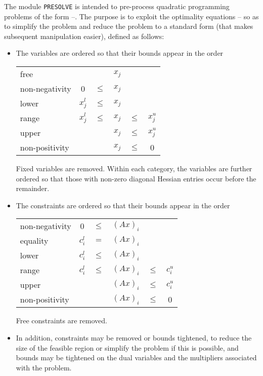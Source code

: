 \documentclass[twoside]{article}
\begin{document}
The module {\tt PRESOLVE} is intended to pre-process
quadratic programming problems of the form --.
The purpose is to exploit the
optimality equations -- so as to simplify the problem
and reduce the problem to a standard form (that makes subsequent
manipulation easier), defined as follows:
\begin{itemize}
\item The variables are ordered so that their bounds appear in the order
\begin{center}
\begin{tabular}{lccccc}
free                &          &        & $x_j$ &        &          \\
non-negativity      &   0      & $\leq$ & $x_j$ &        &          \\
lower               & $x^l_j$ & $\leq$ & $x_j$ &        &          \\
range               & $x^l_j$ & $\leq$ & $x_j$ & $\leq$ & $x^u_j$ \\
upper               &          &        & $x_j$ & $\leq$ & $x^u_j$ \\
non-positivity      &          &        & $x_j$ & $\leq$ &      0   \\
\end{tabular}
\end{center}

Fixed variables are removed. Within each category, the variables
are further ordered so that those with non-zero diagonal Hessian
entries occur before the remainder.

\item
The constraints are ordered so that their bounds appear in the order
\begin{center}
\begin{tabular}{lccccc}
non-negativity      &     0    & $\leq$ & $( A x)_i$ &        &          \\
equality            & $c^l_i$ &   $=$  & $(A x)_i$ &        &          \\
lower               & $c^l_i$ & $\leq$ & $(A x)_i$ &        &          \\
range               & $c^l_i$ & $\leq$ & $(A x)_i$ & $\leq$ & $c^u_i$ \\
upper               &          &        & $(A x)_i$ & $\leq$ & $c^u_i$ \\
non-positivity      &          &        & $(A x)_i$ & $\leq$ &     0    \\
\end{tabular}
\end{center}
Free constraints are removed.

\item
In addition, constraints may be removed or bounds tightened, to reduce the
size of the feasible region or simplify the problem if this is possible, and
bounds may be tightened on the dual variables and the multipliers
associated  with the problem.
\end{itemize}
\end{document}
